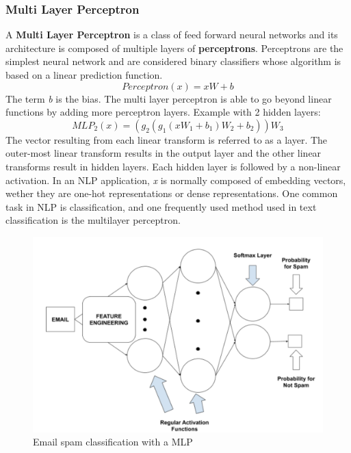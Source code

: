 \documentclass{scrartcl}
\begin{document}
    \subsubsection{ Multi Layer Perceptron }
    A \textbf{Multi Layer Perceptron} is a class of feed forward neural networks and its
    architecture is composed of multiple layers of \textbf{perceptrons}. Perceptrons are
    the simplest neural network and are considered binary classifiers whose algorithm 
    is based on a linear prediction function. \newline
    \begin{equation}
        Perceptron(x) = xW + b
    \end{equation}
    The term \textit{b} is the bias.
    The multi layer perceptron is able to go beyond linear functions by adding more perceptron
    layers.
    Example with 2 hidden layers:
    \begin{equation}
        MLP_2(x) = (g_2(g_1(xW_1 + b_1)W_2 + b_2))W_3
    \end{equation}
    The vector resulting from each linear transform is referred to as a layer. 
    The outer-most linear transform results in the output layer and the other linear transforms 
    result in hidden layers. Each hidden layer is followed by a non-linear activation.
    \newpage
    In an NLP application, \textit{x} is normally composed of embedding vectors, 
    wether they 
    are one-hot representations or dense representations.
    One common task in NLP is classification, and one frequently used method used in text
    classification is the multilayer perceptron.
    \begin{figure}[h!]
        \centering
        \includegraphics[scale=0.2]{mlp.png}
        \caption{Email spam classification with a MLP}
    \end{figure} \newline
\end{document}
